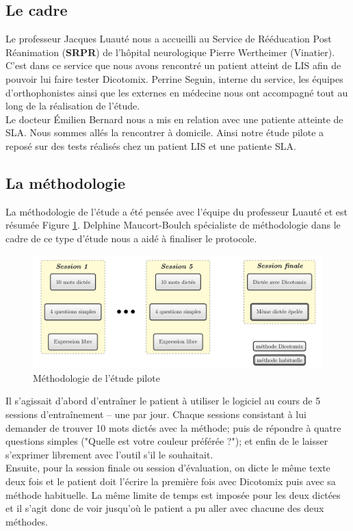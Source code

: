\documentclass[11pt,a4paper]{article}
\theoremstyle{plain}
\theoremstyle{definition}
\begin{document}
\subsection{Le cadre}

Le professeur Jacques Luauté nous a accueilli au Service de Rééducation Post Réanimation (\textbf{SRPR}) de l'hôpital neurologique 
Pierre Wertheimer (Vinatier). C'est dans ce service que nous avons rencontré un patient atteint de LIS afin de pouvoir lui faire tester Dicotomix.
Perrine Seguin, interne du service, les équipes d'orthophonistes ainsi que les externes en médecine nous ont accompagné tout au long de 
la réalisation de l'étude. \\

Le docteur Émilien Bernard nous a mis en relation avec une patiente atteinte de SLA. Nous sommes allés la rencontrer à domicile.
Ainsi notre étude pilote a reposé sur des tests réalisés chez un patient LIS et une patiente SLA.

\subsection{La méthodologie}

La méthodologie de l'étude a été pensée avec l'équipe du professeur Luauté et est résumée Figure \ref{etude}. Delphine Maucort-Boulch spécialiste de méthodologie 
dans le cadre de ce type d'étude nous a aidé à finaliser le protocole.

\begin{figure}[h!]
\centering
\includegraphics[scale=0.2]{images/schemaEtudePilote.jpg}
\caption{Méthodologie de l'étude pilote}
\label{etude}
\end{figure}

Il s'agissait d'abord d'entraîner le patient à utiliser le logiciel au cours de 5 sessions d'entraînement -- une par jour. Chaque sessions 
consistant à lui demander de trouver 10 mots dictés avec la méthode; puis de répondre à quatre questions simples ("Quelle est votre couleur préférée ?"); et 
enfin de le laisser s'exprimer librement avec l'outil s'il le souhaitait. \\
Ensuite, pour la session finale ou session d'évaluation, on dicte le même texte deux fois et le patient doit l'écrire la première fois avec Dicotomix puis avec
sa méthode habituelle. La même limite de temps est imposée pour les deux dictées et il s'agit donc de voir jusqu'où le patient a pu aller avec chacune des 
deux méthodes.
\end{document}
